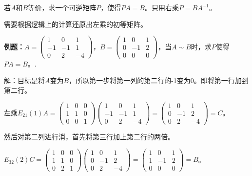 若$A$和$B$等价，求一个可逆矩阵$P$，使得$PA=B$。只用右乘$P=BA^{-1}$。

需要根据逻辑上的计算还原出左乘的初等矩阵。\medskip

\textbf{例题：}$A=\left(\begin{array}{ccc}
    1 & 0 & 1 \\
    -1 & -1 & 1 \\
    0 & 2 & -4
\end{array}\right)$，$B=\left(\begin{array}{ccc}
    1 & 0 & 1 \\
    0 & -1 & 2 \\
    0 & 0 & 0
\end{array}\right)$，当$A\sim B$时，求$P$使得$PA=B$。.

解：目标是将$A$变为$B$，所以第一步将第一列的第二行的-1变为0。即将第一行加到第二行。

左乘$E_{21}(1)A=\left(\begin{array}{ccc}
    1 & 0 & 0 \\
    1 & 1 & 0 \\
    0 & 0 & 1
\end{array}\right)\left(\begin{array}{ccc}
    1 & 0 & 1 \\
    -1 & -1 & 1 \\
    0 & 2 & -4
\end{array}\right)=\left(\begin{array}{ccc}
    1 & 0 & 1 \\
    0 & -1 & 2 \\
    0 & 2 & -4
\end{array}\right)=C$。\medskip

然后对第二列进行消，首先将第三行加上第二行的两倍。

$E_{32}(2)C=\left(\begin{array}{ccc}
    1 & 0 & 0 \\
    1 & 1 & 0 \\
    0 & 2 & 1
\end{array}\right)\left(\begin{array}{ccc}
    1 & 0 & 1 \\
    0 & -1 & 2 \\
    0 & 2 & -4
\end{array}\right)=\left(\begin{array}{ccc}
    1 & 0 & 1 \\
    1 & -1 & 2 \\
    0 & 0 & 0
\end{array}\right)=B$。\medskip


